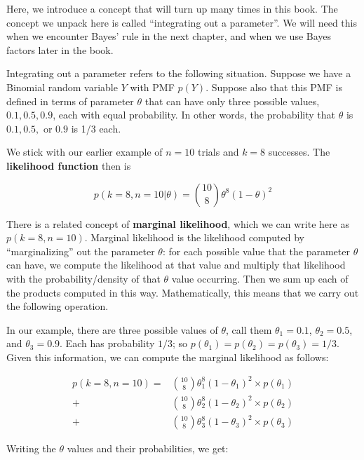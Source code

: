 \documentclass[12pt,]{krantz}
\theoremstyle{definition}
\theoremstyle{definition}
\theoremstyle{definition}
\theoremstyle{remark}
\begin{document}
Here, we introduce a concept that will turn up many times in this book. The concept we unpack here is called ``integrating out a parameter''. We will need this when we encounter Bayes' rule in the next chapter, and when we use Bayes factors later in the book.

Integrating out a parameter refers to the following situation. Suppose we have a Binomial random variable \(Y\) with PMF \(p(Y)\). Suppose also that this PMF is defined in terms of parameter \(\theta\) that can have only three possible values, \(0.1, 0.5, 0.9\), each with equal probability. In other words, the probability that \(\theta\) is \(0.1, 0.5,\) or \(0.9\) is 1/3 each.

We stick with our earlier example of \(n=10\) trials and \(k=8\) successes.
The \textbf{likelihood function} then is

\begin{equation}
p(k=8,n=10|\theta) = \binom{10}{8} \theta^8 (1-\theta)^{2}
\end{equation}

There is a related concept of \textbf{marginal likelihood}, which we can write here as \(p(k=8,n=10)\). Marginal likelihood is the likelihood computed by ``marginalizing'' out the parameter \(\theta\): for each possible value that the parameter \(\theta\) can have, we compute the likelihood at that value and multiply that likelihood with the probability/density of that \(\theta\) value occurring. Then we sum up each of the products computed in this way. Mathematically, this means that we carry out the following operation.

In our example, there are three possible values of \(\theta\),
call them \(\theta_1=0.1\), \(\theta_2=0.5\), and \(\theta_3=0.9\). Each has probability \(1/3\); so \(p(\theta_1)=p(\theta_2)=p(\theta_3)=1/3\). Given this information, we can compute the marginal likelihood as follows:

\begin{equation}
\begin{split}
p(k=8,n=10) =& \binom{10}{8} \theta_1^8 (1-\theta_1)^{2} \times p(\theta_1) \\
            +& \binom{10}{8} \theta_2^8 (1-\theta_2)^{2}\times p(\theta_2) \\
            +& \binom{10}{8} \theta_3^8 (1-\theta_3)^{2}\times p(\theta_3)
\end{split}
\end{equation}

Writing the \(\theta\) values and their probabilities, we get:
\end{document}
